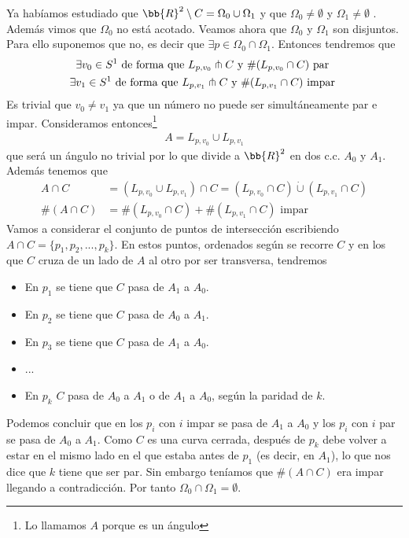 Ya habíamos estudiado que $\bb{R}^2 \setminus C = \Omega_0 \cup \Omega_1$  y que $\Omega_0\neq \emptyset$ y $\Omega_1 \neq \emptyset$ . Además vimos que $\Omega_0$ no está acotado. Veamos ahora que $\Omega_0$ y $\Omega_1$ son disjuntos. Para ello suponemos que no, es decir que $\exists p\in \Omega_0\cap \Omega_1$. Entonces tendremos que
\begin{gather*}
    \exists v_0\in S^1 \text{ de forma que } L_{p,v_0}\pitchfork C \text{ y } \#(L_{p,v_0} \cap C) \text{ par }\\
    \exists v_1\in S^1 \text{ de forma que } L_{p,v_1}\pitchfork C \text{ y } \#(L_{p,v_1} \cap C) \text{ impar }
\end{gather*}
Es trivial que $v_0\neq v_1$ ya que un número no puede ser simultáneamente par e impar. Consideramos entonces\footnote{Lo llamamos $A$ porque es un ángulo}
\begin{gather*}
    A = L_{p,v_0} \cup L_{p, v_1}
\end{gather*}
que será un ángulo no trivial por lo que divide a $\bb{R}^2$ en dos c.c. $A_0$ y $A_1$. Además tenemos que
\begin{align*}
    A\cap C &= (L_{p, v_0} \cup L_{p, v_1}) \cap C = (L_{p,v_0} \cap C) \dot{\cup} (L_{p, v_1}\cap C)\\
    \#(A\cap C) &= \# (L_{p,v_0} \cap C) + \#(L_{p,v_1} \cap C) \text{ impar}
\end{align*}
Vamos a considerar el conjunto de puntos de intersección escribiendo $A\cap C = \{p_1, p_2, ..., p_k\}$. En estos puntos, ordenados según se recorre $C$ y en los que $C$ cruza de un lado de $A$ al otro por ser transversa, tendremos
\begin{itemize}[label=-, noitemsep]
    \item En $p_1$ se tiene que $C$ pasa de $A_1$ a $A_0$.
    \item En $p_2$ se tiene que $C$ pasa de $A_0$ a $A_1$.
    \item En $p_3$ se tiene que $C$ pasa de $A_1$ a $A_0$.
    \item ...
    \item En $p_k$ $C$ pasa de $A_0$ a $A_1$ o de $A_1$ a $A_0$, según la paridad de $k$.
\end{itemize}
Podemos concluir que en los $p_i$ con $i$ impar se pasa de $A_1$ a $A_0$ y los $p_i$ con $i$ par se pasa de $A_0$ a $A_1$. Como $C$ es una curva cerrada, después de $p_k$ debe volver a estar en el mismo lado en el que estaba antes de $p_1$ (es decir, en $A_1$), lo que nos dice que $k$ tiene que ser par. Sin embargo teníamos que $\#(A\cap C)$ era impar llegando a contradicción. Por tanto $\Omega_0\cap \Omega_1 = \emptyset$.\\

